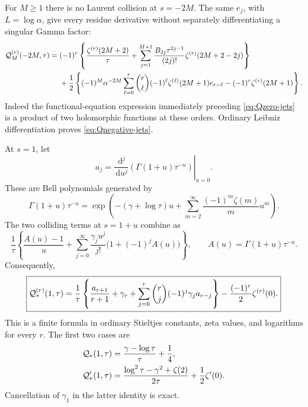 \documentclass[11pt,letterpaper]{article}
\numberwithin{equation}{section}
\theoremstyle{definition}
\theoremstyle{remark}
\newcommand{\dd}{\,\mathrm d}
\begin{document}
For \(M\ge1\) there is no Laurent collision at \(s=-2M\).
The same \(e_j\), with \(L=\log\alpha\), give every residue
derivative without separately differentiating a singular Gamma
factor:
\begin{equation}\label{eq:Qnegative-jets}
 \begin{split}
 {\cal Q}_M^{(r)}(-2M,\tau)
 ={}&(-1)^r\left\{\frac{\zeta^{(r)}(2M+2)}{\tau}
    +\sum_{j=1}^{M+1}\frac{B_{2j}\tau^{2j-1}}{(2j)!}
                    \zeta^{(r)}(2M+2-2j)\right\}\\
 &+\frac12\left\{(-1)^M\alpha^{-2M}
      \sum_{\ell=0}^{r}\binom r\ell(-1)^\ell
                \zeta^{(\ell)}(2M+1)e_{r-\ell}
              -(-1)^r\zeta^{(r)}(2M+1)\right\}.
 \end{split}
\end{equation}
Indeed the functional-equation expression immediately preceding
\eqref{eq:Qzero-jets} is a product of two holomorphic functions
at these orders. Ordinary Leibniz differentiation proves
\eqref{eq:Qnegative-jets}.

At \(s=1\), let
\begin{equation}\label{eq:mod-A}
 a_j=\left.\frac{\dd^j}{\dd u^j}
            \left(\Gamma(1+u)\tau^{-u}\right)\right|_{u=0}.
\end{equation}
These are Bell polynomials generated by
\[
 \Gamma(1+u)\tau^{-u}
 =\exp\left(-(\gamma+\log\tau)u+
          \sum_{m=2}^{\infty}\frac{(-1)^m\zeta(m)}m u^m\right).
\]
The two colliding terms at \(s=1+u\) combine as
\[
 \frac1{\tau}
 \left\{\frac{A(u)-1}{u}
       +\sum_{j=0}^{\infty}\frac{\gamma_j u^j}{j!}
                              \bigl(1+(-1)^j A(u)\bigr)\right\},
 \qquad A(u)=\Gamma(1+u)\tau^{-u}.
\]
Consequently,
\begin{equation}\label{eq:Qone-jets}
 \boxed{\displaystyle
 {\cal Q}_*^{(r)}(1,\tau)=
 \frac1{\tau}\left\{\frac{a_{r+1}}{r+1}+\gamma_r+
     \sum_{j=0}^{r}\binom rj(-1)^j\gamma_j a_{r-j}\right\}
       -\frac{(-1)^r}{2}\zeta^{(r)}(0).}
\end{equation}
This is a finite formula in ordinary Stieltjes constants,
zeta values, and logarithms for every \(r\).
The first two cases are
\begin{align}
 {\cal Q}_*(1,\tau)&=\frac{\gamma-\log\tau}{\tau}+\frac14,
 \label{eq:Qone-first}\\
 {\cal Q}_*'(1,\tau)&=
       \frac{\log^2\tau-\gamma^2+\zeta(2)}{2\tau}
                    +\frac12\zeta'(0).
 \label{eq:Qone-second}
\end{align}
Cancellation of \(\gamma_1\) in the latter identity is exact.
\end{document}
